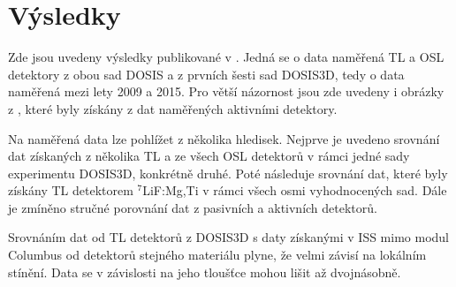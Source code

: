 \section{Výsledky}
Zde jsou uvedeny výsledky publikované v \cite{dosis}. Jedná se o data naměřená TL a OSL detektory z obou sad DOSIS a z prvních šesti sad DOSIS3D, tedy o data naměřená mezi lety 2009 a 2015. Pro větší názornost jsou zde uvedeny i obrázky z \cite{dosis2}, které byly získány z dat naměřených aktivními detektory. 

Na naměřená data lze pohlížet z několika hledisek. Nejprve je uvedeno srovnání dat získaných z několika TL a ze všech OSL detektorů v rámci jedné sady experimentu DOSIS3D, konkrétně druhé. Poté následuje srovnání dat, které byly získány TL detektorem $^7$LiF:Mg,Ti v rámci všech osmi vyhodnocených sad. Dále je zmíněno stručné porovnání dat z pasivních a aktivních detektorů. 

Srovnáním dat od TL detektorů z DOSIS3D s daty získanými v ISS mimo modul Columbus od detektorů stejného materiálu plyne, že velmi závisí na lokálním stínění. Data se v závislosti na jeho tloušťce mohou lišit až dvojnásobně.  

